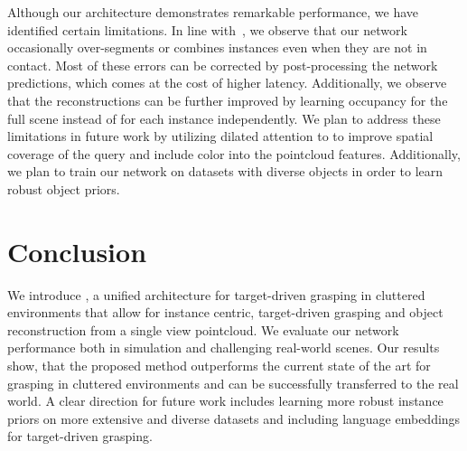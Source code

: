 \documentclass[letterpaper, 10 pt, conference]{ieeeconf}  %
\begin{document}
Although our architecture demonstrates remarkable performance, we have identified certain limitations. In line with~\cite{schult2022mask3d}, we observe that our network occasionally over-segments or combines instances even when they are not in contact. Most of these errors can be corrected by post-processing the network predictions, which comes at the cost of higher latency. Additionally, we observe that the reconstructions can be further improved by learning occupancy for the full scene instead of for each instance independently.    
We plan to address these limitations in future work by utilizing dilated attention to 
to improve spatial coverage of the query and include color into the pointcloud features. Additionally, we plan to train our network on datasets with diverse objects in order to learn robust object priors. 
\section{Conclusion}
\label{sec:conclusion}
We introduce \OurMethod, a unified architecture for target-driven grasping in cluttered environments that allow for instance centric, target-driven grasping and object reconstruction from a single view pointcloud. 
We evaluate our network performance both in simulation and challenging real-world scenes. Our results show, that the proposed method outperforms the current state of the art for grasping in cluttered environments and can be successfully transferred to the real world. 
A clear direction for future work includes learning more robust instance priors on more extensive and  diverse datasets and including language embeddings for target-driven grasping. 
\clearpage




{\small


}


 
\end{document}
